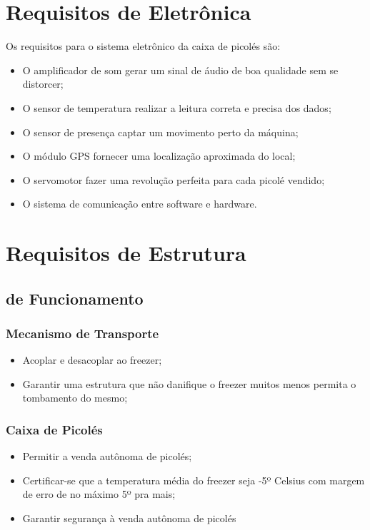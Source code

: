 \section{Requisitos de Eletrônica}

Os requisitos para o sistema eletrônico da caixa de picolés são:

\begin{itemize}
	\item O amplificador de som gerar um sinal de áudio de boa qualidade sem se distorcer;
    \item O sensor de temperatura realizar a leitura correta e precisa dos dados;
    \item O sensor de presença captar um movimento perto da máquina;
    \item O módulo GPS fornecer uma localização aproximada do local;
    \item O servomotor fazer uma revolução perfeita para cada picolé vendido;
    \item O sistema de comunicação entre software e hardware.
\end{itemize}

\section{Requisitos de Estrutura}

\subsection{de Funcionamento}

\subsubsection{Mecanismo de Transporte}
\begin{itemize}
\item Acoplar e desacoplar ao freezer;
\item Garantir uma estrutura que não danifique o freezer muitos menos permita o tombamento do mesmo;

\end{itemize}
\subsubsection{Caixa de Picolés}
\begin{itemize}
\item Permitir a venda autônoma de picolés;
\item Certificar-se que a temperatura média do freezer seja -5º Celsius com margem de erro de no máximo 5º pra mais;
\item Garantir segurança à venda autônoma de picolés
\end{itemize}

